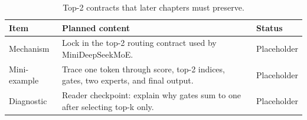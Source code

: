 \begin{table}[H]
\centering
\caption{Top-2 contracts that later chapters must preserve.}
\label{tab:ch05-chapter-summary-and-handoff}
\begin{tabularx}{\textwidth}{p{}X p{}}
\toprule
Item & Planned content & Status \\
\midrule
Mechanism & Lock in the top-2 routing contract used by MiniDeepSeekMoE. & Placeholder \\
Mini-example & Trace one token through score, top-2 indices, gates, two experts, and final output. & Placeholder \\
Diagnostic & Reader checkpoint: explain why gates sum to one after selecting top-k only. & Placeholder \\
\bottomrule
\end{tabularx}
\end{table}
